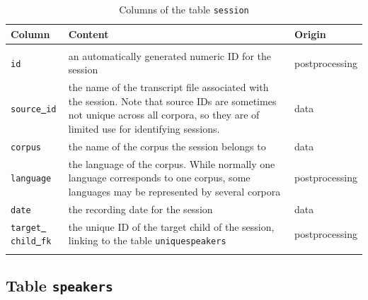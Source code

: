 \documentclass[a4paper, 11pt]{book}
\newcommand{\und}{\underline{{ }}\hspace{0.2mm}}	%
\begin{document}
\begin{longtable}{lp{.5\linewidth}p{.2\linewidth}}
	\toprule
		\textbf{Column} & \textbf{Content} 	& \textbf{Origin} \\
	\midrule
	\endhead
		
	\bottomrule\\[-0.15cm]
	\caption{Columns of the table \texttt{session}}
	\endfoot
	
	
		\texttt{id}				& an automatically generated numeric ID for the session & postprocessing \\
		\texttt{source\und id}	& the name of the transcript file associated with the session. Note that source IDs are sometimes not unique across all corpora, 
			 					  so they are of limited use for identifying sessions. & data \\
		\texttt{corpus}			& the name of the corpus the session belongs to & data \\
		\texttt{language}		& the language of the corpus. While normally one language corresponds to one corpus, some languages may be represented by several corpora & postprocessing \\
		\texttt{date} 			& the recording date for the session & data \\ 
		\texttt{target\und child\und fk}  & the unique ID of the target child of the session, linking to the table \texttt{uniquespeakers} & postprocessing \\ 
		\label{tab:Table sessions}
\end{longtable}


\subsection{Table \texttt{speakers}}
\label{subsec:Table speakers}
\end{document}
